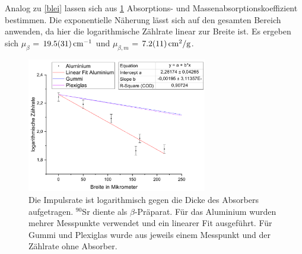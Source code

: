 \documentclass[
	a4paper,
	12pt,
	pagesize,
	ngerman
]{scrartcl}
\begin{document}
	Analog zu \cref{blei} lassen sich aus \cref{BetaAlu} Absorptions- und Massenabsorptionskoeffizient bestimmen. 
	Die exponentielle Näherung lässt sich auf den gesamten Bereich anwenden, da hier die logarithmische Zählrate linear zur Breite ist.
	Es ergeben sich $\mu_\beta$ = $\SI{19,5 +- 3,1}{cm^{-1}}$ und $\mu_{\beta,m}$ = $\SI{7,2+-1,1}{cm^2/g}$.
	\begin{figure}[H]
		\includegraphics[width=0.7\textwidth]{BetaAlu}
		\centering
		\caption{Die Impulsrate ist logarithmisch gegen die Dicke des Absorbers aufgetragen. $ ^{90}$Sr diente als $\beta$-Präparat. Für das Aluminium wurden mehrer Messpunkte verwendet und ein linearer Fit ausgeführt. Für Gummi und Plexiglas wurde aus jeweils einem Messpunkt und der Zählrate ohne Absorber.}
		\label{BetaAlu}
		\centering
	\end{figure}	
	
\end{document}
